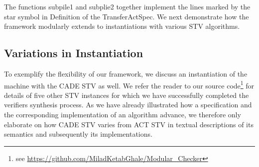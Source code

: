 \documentclass[10pt,conference]{IEEEtran}
\begin{document}
The functions subpile1 and subplie2 together implement the lines marked by the star symbol in Definition of the TransferActSpec. We next demonstrate how the framework modularly extends to instantiations  with various STV algorithms.
\subsection{Variations in Instantiation}
To exemplify the flexibility of our framework, we discuss an instantiation of the machine with the CADE STV as well. We refer the reader to our source code\footnote{see  \url{https://github.com/MiladKetabGhale/Modular_Checker}} for details of five other STV instances for which we have successfully completed the verifiers synthesis process. 
As we have already illustrated how a specification and the corresponding implementation of an algorithm advance, we therefore only elaborate on how CADE STV varies from ACT STV in textual descriptions of its  semantics and subsequently its implementations. 
\end{document}
